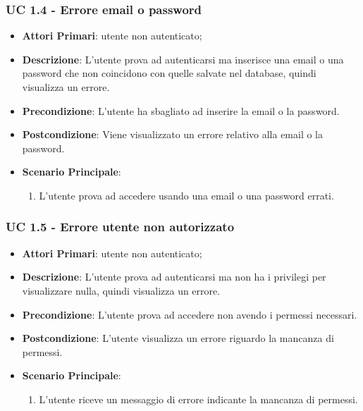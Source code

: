 		\subsubsection{UC 1.4 - Errore email o password}
		\begin{itemize}
			\item \textbf{Attori Primari}: utente non autenticato;
			\item \textbf{Descrizione}: L'utente prova ad autenticarsi ma inserisce una email o una password che non coincidono con quelle salvate nel database, quindi visualizza un errore.
			\item \textbf{Precondizione}: L'utente ha sbagliato ad inserire la email o la password.
			\item \textbf{Postcondizione}: Viene visualizzato un errore relativo alla email o la password.
			\item \textbf{Scenario Principale}:
			\begin{enumerate}
				\item L'utente prova ad accedere usando una email o una password errati.
			\end{enumerate}	
		\end{itemize}

		\subsubsection{UC 1.5 - Errore utente non autorizzato}
		\begin{itemize}
			\item \textbf{Attori Primari}: utente non autenticato;
			\item \textbf{Descrizione}: L'utente prova ad autenticarsi ma non ha i privilegi per visualizzare nulla, quindi visualizza un errore.
			\item \textbf{Precondizione}: L'utente prova ad accedere non avendo i permessi necessari.
			\item \textbf{Postcondizione}: L'utente visualizza un errore riguardo la mancanza di permessi.
			\item \textbf{Scenario Principale}:
			\begin{enumerate}
				\item L'utente riceve un messaggio di errore indicante la mancanza di permessi.
			\end{enumerate}	
		\end{itemize}

